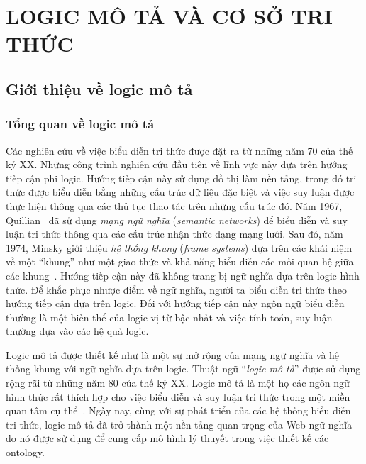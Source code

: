 \chapter[Logic mô tả và cơ sở tri thức]{LOGIC MÔ TẢ VÀ CƠ SỞ TRI THỨC}
\label{Chapter1}
\thispagestyle{fancy}

\section{Giới thiệu về logic mô tả}
\label{sec:Chap1.Introduction}
\subsection{Tổng quan về logic mô tả}
\label{sec:Chap1.Overview}
Các nghiên cứu về việc biểu diễn tri thức được đặt ra từ những năm 70 của thế kỷ XX. Những công trình nghiên cứu đầu tiên về lĩnh vực này dựa trên hướng tiếp cận phi logic. Hướng tiếp cận này sử dụng đồ thị làm nền tảng, trong đó tri thức được biểu diễn bằng những cấu trúc dữ liệu đặc biệt và việc suy luận được thực hiện thông qua các thủ tục thao tác trên những cấu trúc đó. Năm 1967, Quillian~\cite{Quillian1967} đã sử dụng {\em mạng ngữ nghĩa} ({\em semantic networks}) để biểu diễn và suy luận tri thức thông qua các cấu trúc nhận thức dạng mạng lưới. Sau đó, năm 1974, Minsky giới thiệu {\em hệ thống khung} ({\em frame systems}) dựa trên các khái niệm về một ``khung'' như một giao thức và khả năng biểu diễn các mối quan hệ giữa các khung~\cite{Minski1974}. Hướng tiếp cận này đã không trang bị ngữ nghĩa dựa trên logic hình thức. Để khắc phục nhược điểm về ngữ nghĩa, người ta biểu diễn tri thức theo hướng tiếp cận dựa trên logic. Đối với hướng tiếp cận này ngôn ngữ biểu diễn thường là một biến thể của logic vị từ bậc nhất và việc tính toán, suy luận thường dựa vào các hệ quả logic.

Logic mô tả được thiết kế như là một sự mở rộng của mạng ngữ nghĩa và hệ thống khung với ngữ nghĩa dựa trên logic. Thuật ngữ ``{\em logic mô tả}'' được sử dụng rộng rãi từ những năm 80 của thế kỷ XX. Logic mô tả là một họ các ngôn ngữ hình thức rất thích hợp cho việc biểu diễn và suy luận tri thức trong một miền quan tâm cụ thể~\cite{DLHandbook2007}. Ngày nay, cùng với sự phát triển của các hệ thống biểu diễn tri thức, logic mô tả đã trở thành một nền tảng quan trọng của Web ngữ nghĩa do nó được sử dụng để cung cấp mô hình lý thuyết trong việc thiết kế các ontology.


